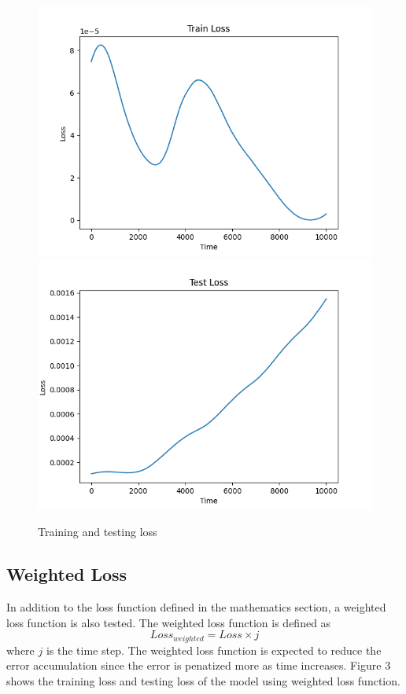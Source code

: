 \documentclass[12pt, a4paper]{article}
\begin{document}
\begin{figure}
    \centering
    \includegraphics[scale=0.4]{../Train_loss.png}
    \includegraphics[scale=0.4]{../Test_loss.png}
    \caption[]{Training and testing loss}
    \label{fig:loss}
\end{figure}

\subsection{Weighted Loss}
In addition to the loss function defined in the mathematics section, a weighted loss function is also tested. The weighted loss function is defined as
$$ Loss_{weighted} = Loss \times j$$
where $j$ is the time step. The weighted loss function is expected to reduce the error accumulation since the error is penatized more as time increases. Figure 3 shows the training loss and testing loss of the model using weighted loss function. 
\end{document}
